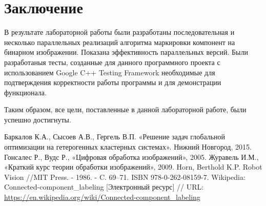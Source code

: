 \documentclass{report}
\begin{document}
	\section*{Заключение}
		\par В результате лабораторной работы были разработаны последовательная и несколько параллельных реализаций алгоритма маркировки компонент на бинарном изображении. Показана эффективность параллельных версий. Были разработаныя тесты, созданные для данного программного проекта с использованием Google C++ Testing Framework необходимые для подтверждения корректности работы программы и для демонстрации функционала.
		\par Таким образом, все цели, поставленные в данной лабораторной работе, были успешно достигнуты.
	\newpage


	\begin{thebibliography}{1}
	     Баркалов К.А., Сысоев А.В., Гергель В.П. «Решение задач глобальной оптимизации на гетерогенных кластерных системах». Нижний Новгород, 2015. 
	     Гонсалес Р., Вудс Р., «Цифровая обработка изображений», 2005.
	     Журавель И.М., «Краткий курс теории обработки изображений», 2009.
	     Horn, Berthold K.P. Robot Vision //MIT Press. - 1986. - C. 69–71. ISBN 978-0-262-08159-7.
		 Wikipedia: Connected-component\_labeling [Электронный ресурс] // URL: \url {https://en.wikipedia.org/wiki/Connected-component_labeling}
	\end{thebibliography}
	\newpage


\end{document}
